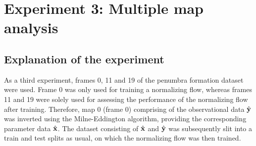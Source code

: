 \documentclass[a4paper,12pt]{report}
\begin{document}
\FloatBarrier

\section{Experiment 3: Multiple map analysis}
\subsection{Explanation of the experiment}
As a third experiment, frames 0, 11 and 19 of the penumbra formation dataset were used. Frame 0 was only used for training a normalizing flow, whereas frames 11 and 19 were solely used for assessing the performance of the normalizing flow after training. Therefore, map 0 (frame 0) comprising of the observational data $\hat{\boldsymbol{\mathbf{y}}}$ was inverted using the Milne-Eddington algorithm, providing the corresponding parameter data $\hat{\boldsymbol{\mathbf{x}}}$. The dataset consisting of $\hat{\boldsymbol{\mathbf{x}}}$ and $\hat{\boldsymbol{\mathbf{y}}}$ was subsequently slit into a train and test splits as usual, on which the normalizing flow was then trained.
\end{document}
